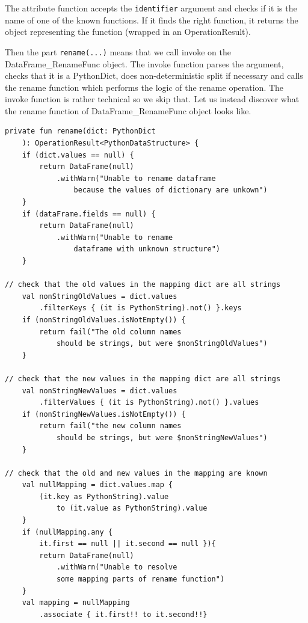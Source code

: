 The attribute function accepts the \verb|identifier| argument and checks if it is the name of one of the known functions.
If it finds the right function, it returns the object representing the function (wrapped in an OperationResult).

Then the part \verb|rename(...)| means that we call invoke on the \\ DataFrame\_RenameFunc object.
The invoke function parses the argument, checks that it is a PythonDict, does non-deterministic split if necessary and
calls the rename function which performs the logic of the rename operation.
The invoke function is rather technical so we skip that.
Let us instead discover what the rename function of DataFrame\_RenameFunc object looks like.

\begin{lstlisting}[caption=The rename function of DataFrame\_RenameFunc, label={lst:rename_invoke}, captionpos=b]
private fun rename(dict: PythonDict
    ): OperationResult<PythonDataStructure> {
    if (dict.values == null) {
        return DataFrame(null)
            .withWarn("Unable to rename dataframe
                because the values of dictionary are unkown")
    }
    if (dataFrame.fields == null) {
        return DataFrame(null)
            .withWarn("Unable to rename
                dataframe with unknown structure")
    }

// check that the old values in the mapping dict are all strings
    val nonStringOldValues = dict.values
        .filterKeys { (it is PythonString).not() }.keys
    if (nonStringOldValues.isNotEmpty()) {
        return fail("The old column names
            should be strings, but were $nonStringOldValues")
    }

// check that the new values in the mapping dict are all strings
    val nonStringNewValues = dict.values
        .filterValues { (it is PythonString).not() }.values
    if (nonStringNewValues.isNotEmpty()) {
        return fail("the new column names
            should be strings, but were $nonStringNewValues")
    }

// check that the old and new values in the mapping are known
    val nullMapping = dict.values.map {
        (it.key as PythonString).value
            to (it.value as PythonString).value
    }
    if (nullMapping.any {
        it.first == null || it.second == null }){
        return DataFrame(null)
            .withWarn("Unable to resolve
            some mapping parts of rename function")
    }
    val mapping = nullMapping
        .associate { it.first!! to it.second!!}


\end{lstlisting}
